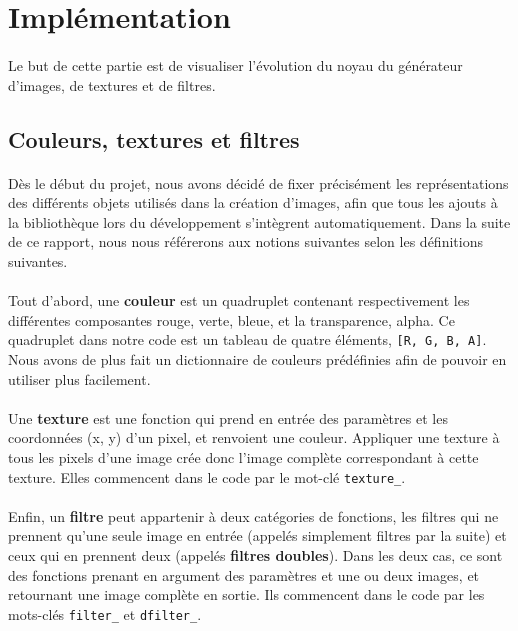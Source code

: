 \documentclass[a4paper]{article}
\begin{document}
\section{Implémentation}
\paragraph{}
Le but de cette partie est de visualiser l'évolution du noyau du générateur d'images, de textures et de filtres. 

\subsection{Couleurs, textures et filtres}
\label{sec:colors}

\paragraph{}
Dès le début du projet, nous avons décidé de fixer précisément les représentations des différents objets utilisés dans la création d'images, afin que tous les ajouts à la bibliothèque lors du développement s'intègrent automatiquement. Dans la suite de ce rapport, nous nous référerons aux notions suivantes selon les définitions suivantes.

\paragraph{} 
Tout d'abord, une \textbf{couleur} est un quadruplet contenant respectivement les différentes composantes rouge, verte, bleue, et la transparence, alpha. Ce quadruplet dans notre code est un tableau de quatre éléments, \texttt{[R, G, B, A]}. Nous avons de plus fait un dictionnaire de couleurs prédéfinies afin de pouvoir en utiliser plus facilement.

\paragraph{}
Une \textbf{texture} est une fonction qui prend en entrée des paramètres et les coordonnées (x, y) d'un pixel, et renvoient une couleur. Appliquer une texture à tous les pixels d'une image crée donc l'image complète correspondant à cette texture. Elles commencent dans le code par le mot-clé \texttt{texture\_}.

\paragraph{}
Enfin, un \textbf{filtre} peut appartenir à deux catégories de fonctions, les filtres qui ne prennent qu'une seule image en entrée (appelés simplement filtres par la suite) et ceux qui en prennent deux (appelés \textbf{filtres doubles}). Dans les deux cas, ce sont des fonctions prenant en argument des paramètres et une ou deux images, et retournant une image complète en sortie. Ils commencent dans le code par les mots-clés \texttt{filter\_} et \texttt{dfilter\_}.
\end{document}
